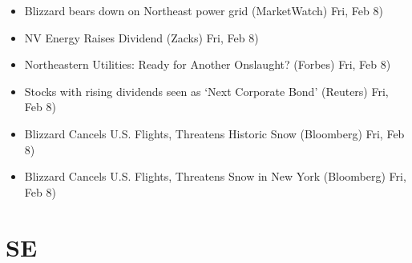 \documentclass[11pt,asymmetric]{article}
\begin{document}
\begin{itemize}
\item Blizzard bears down on Northeast power grid (MarketWatch) Fri, Feb 8)
\item NV Energy Raises Dividend (Zacks) Fri, Feb 8)
\item Northeastern Utilities: Ready for Another Onslaught? (Forbes) Fri, Feb 8)
\item Stocks with rising dividends seen as `Next Corporate Bond' (Reuters) Fri, Feb 8)
\item Blizzard Cancels U.S. Flights, Threatens Historic Snow (Bloomberg) Fri, Feb 8)
\item Blizzard Cancels U.S. Flights, Threatens Snow in New York (Bloomberg) Fri, Feb 8)
\end{itemize}

\section*{SE}
\end{document}
